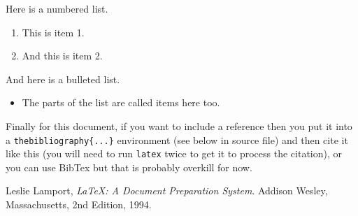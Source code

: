 Here is a numbered list.

\begin{enumerate}

    \item
    This is item 1.
    
    \item
    And this is item 2.
    
\end{enumerate}

And here is a bulleted list.

\begin{itemize}

    \item
    The parts of the list are called items here too.
    
\end{itemize}

Finally for this document, if you want to include a reference
then you put it into a \texttt{thebibliography\{...\}}
environment (see below in source file) and then 
cite it like this \cite{lamport94}
(you will need to run \texttt{latex} twice to get it to process the citation),
or you can use BibTex but that is probably overkill for now.

\begin{thebibliography}{9}

  Leslie Lamport,
  \emph{\LaTeX: A Document Preparation System}.
  Addison Wesley, Massachusetts,
  2nd Edition,
  1994.

\end{thebibliography}



